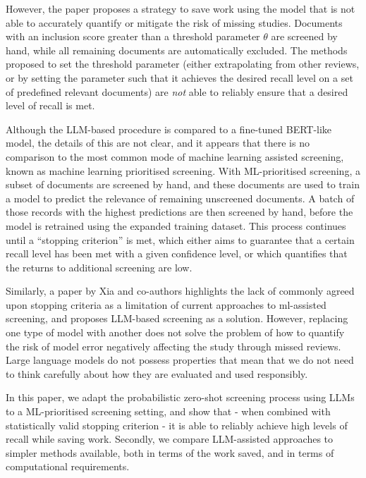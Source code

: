 \documentclass{article}
\begin{document}
	However, the paper proposes a strategy to save work using the model that is not able to accurately quantify or mitigate the risk of missing studies. Documents with an inclusion score greater than a threshold parameter $\theta$ are screened by hand, while all remaining documents are automatically excluded. The methods proposed to set the threshold parameter (either extrapolating from other reviews, or by setting the parameter such that it achieves the desired recall level on a set of predefined relevant documents) are \textit{not} able to reliably ensure that a desired level of recall is met. 
	
	Although the LLM-based procedure is compared to a fine-tuned BERT-like model, the details of this are not clear, and it appears that there is no comparison to the most common mode of machine learning assisted screening, known as machine learning prioritised screening. With ML-prioritised screening, a subset of documents are screened by hand, and these documents are used to train a model to predict the relevance of remaining unscreened documents. A batch of those records with the highest predictions are then screened by hand, before the model is retrained using the expanded training dataset. This process continues until a ``stopping criterion'' \cite{SneydS19, callaghan_statistical_2020, lewis_confidence_2023} is met, which either aims to guarantee that a certain recall level has been met with a given confidence level, or which quantifies that the returns to additional screening are low. 

    Similarly, a paper by Xia and co-authors \cite{xia_llmscreen_2024} highlights the lack of commonly agreed upon stopping criteria as a limitation of current approaches to ml-assisted screening, and proposes LLM-based screening as a solution. However, replacing one type of model with another does not solve the problem of how to quantify the risk of model error negatively affecting the study through missed reviews. Large language models do not possess properties that mean that we do not need to think carefully about how they are evaluated and used responsibly.
	
	In this paper, we adapt the probabilistic zero-shot screening process using LLMs to a ML-prioritised screening setting, and show that - when combined with statistically valid stopping criterion - it is able to reliably achieve high levels of recall while saving work. Secondly, we compare LLM-assisted approaches to simpler methods available, both in terms of the work saved, and in terms of computational requirements.
	
\end{document}
